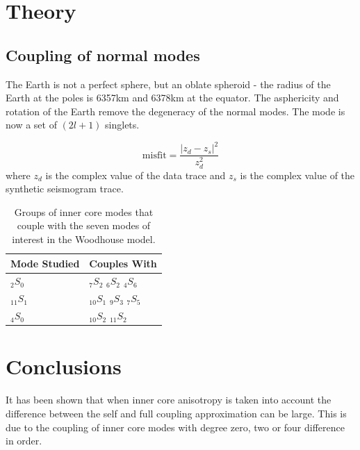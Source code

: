 \documentclass[11pt,a4paper,oneside,titlepage]{article}
\begin{document}
\section{Theory}

\subsection{Coupling of normal modes}
The Earth is not a perfect sphere, but an oblate spheroid - the radius of the Earth at the poles is 6357km and 6378km at the equator. The asphericity and rotation of the Earth remove the degeneracy of the normal modes. The mode is now a set of $(2l+1)$ singlets. 

\begin{equation} \label{eq:misfit}
\mathrm{misfit} = \frac {\left|z_d - z_s\right| ^2}{z_d^2}
\end{equation}
where $z_d$ is the complex value of the data trace and $z_s$ is the complex
value of the synthetic seismogram trace.




\begin{table}
\begin{center}
\caption{Groups of inner core modes that couple with the seven modes of interest in the Woodhouse model.}
\begin{tabular}{|l|l|}
\hline
Mode Studied & Couples With \\
\hline
$_2S_0$ & $_7S_2$ $_6S_2$ $_4S_6$ \\
$_{11}S_1$ & $_{10}S_1$ $_9S_3$ $_7S_5$ \\
$_4S_0$ & $_{10}S_2$ $_{11}S_2$ \\
\hline
\end{tabular}
\end{center}
\end{table}





\section{Conclusions}

It has been shown that when inner core anisotropy is taken into account the difference between the self and full coupling approximation can be large. This is due to the coupling of inner core modes with degree zero, two or four difference in order.


\end{document}
